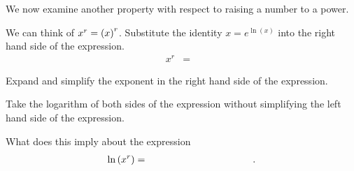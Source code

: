 \begin{problem}
  \clearpage

\item We now examine another property with respect to raising a number
  to a power.
  \begin{subproblem}
  \item We can think of $x^r=\left( x \right)^r$. Substitute the identity
    $x=e^{\ln(x)}$ into the right hand side of the expression.
    \begin{eqnarray}
      \label{eqn:exponentialMultiplication}
      x^r & = & 
    \end{eqnarray}
    \item Expand and simplify the exponent in the right hand side of
      the expression.
      \vfill
    \item Take the logarithm of both sides of the expression without
      simplifying the left hand side of the expression.
      \vfill
    \item What does this imply about the expression
    \begin{eqnarray*}
      \ln\lp x^r \rp & = & \hspace{10em}.
    \end{eqnarray*}
  \end{subproblem}


\end{problem}

\postClass


